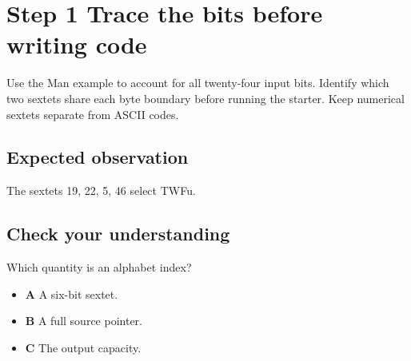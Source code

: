 \section{Step 1 Trace the bits before writing code}\label{base64-s01}

Use the Man example to account for all twenty-four input bits. Identify which two sextets share each byte boundary before running the starter. Keep numerical sextets separate from ASCII codes.

\subsection{Expected observation}
The sextets 19, 22, 5, 46 select TWFu.

\subsection{Check your understanding}
Which quantity is an alphabet index?

\begin{itemize}
  \item \textbf{A} A six-bit sextet.
  \item \textbf{B} A full source pointer.
  \item \textbf{C} The output capacity.
\end{itemize}

